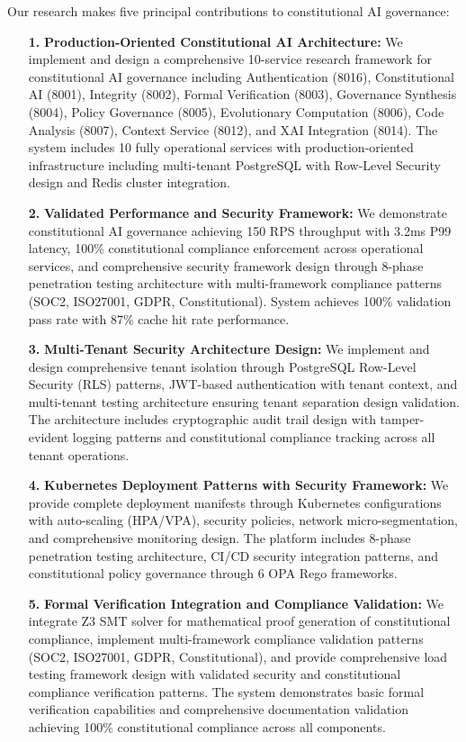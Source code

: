 \documentclass[manuscript,screen,9pt]{acmart}
\begin{document}
Our research makes five principal contributions to constitutional AI governance:
\begin{enumerate}[leftmargin=*,itemsep=2pt,parsep=1pt]
    \item[\textbf{1.}] \textbf{Production-Oriented Constitutional AI Architecture:} We implement and design a comprehensive 10-service research framework for constitutional AI governance including Authentication (8016), Constitutional AI (8001), Integrity (8002), Formal Verification (8003), Governance Synthesis (8004), Policy Governance (8005), Evolutionary Computation (8006), Code Analysis (8007), Context Service (8012), and XAI Integration (8014). The system includes 10 fully operational services with production-oriented infrastructure including multi-tenant PostgreSQL with Row-Level Security design and Redis cluster integration.

    \item[\textbf{2.}] \textbf{Validated Performance and Security Framework:} We demonstrate constitutional AI governance achieving 150 RPS throughput with 3.2ms P99 latency, 100\% constitutional compliance enforcement across operational services, and comprehensive security framework design through 8-phase penetration testing architecture with multi-framework compliance patterns (SOC2, ISO27001, GDPR, Constitutional). System achieves 100\% validation pass rate with 87\% cache hit rate performance.

    \item[\textbf{3.}] \textbf{Multi-Tenant Security Architecture Design:} We implement and design comprehensive tenant isolation through PostgreSQL Row-Level Security (RLS) patterns, JWT-based authentication with tenant context, and multi-tenant testing architecture ensuring tenant separation design validation. The architecture includes cryptographic audit trail design with tamper-evident logging patterns and constitutional compliance tracking across all tenant operations.

    \item[\textbf{4.}] \textbf{Kubernetes Deployment Patterns with Security Framework:} We provide complete deployment manifests through Kubernetes configurations with auto-scaling (HPA/VPA), security policies, network micro-segmentation, and comprehensive monitoring design. The platform includes 8-phase penetration testing architecture, CI/CD security integration patterns, and constitutional policy governance through 6 OPA Rego frameworks.

    \item[\textbf{5.}] \textbf{Formal Verification Integration and Compliance Validation:} We integrate Z3 SMT solver for mathematical proof generation of constitutional compliance, implement multi-framework compliance validation patterns (SOC2, ISO27001, GDPR, Constitutional), and provide comprehensive load testing framework design with validated security and constitutional compliance verification patterns. The system demonstrates basic formal verification capabilities and comprehensive documentation validation achieving 100\% constitutional compliance across all components.
\end{enumerate}
\end{document}
